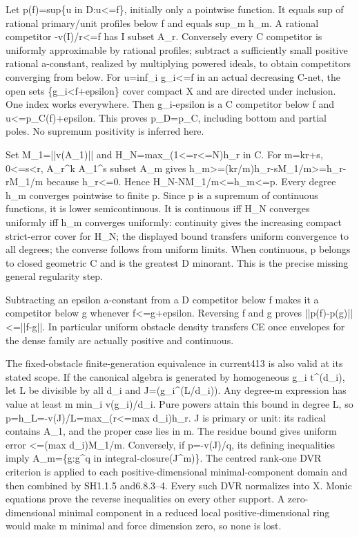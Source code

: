 \documentclass[11pt]{article}
\begin{document}
Let p(f)=sup\{u in D:u<=f\}, initially only a pointwise function. It equals sup of rational primary/unit profiles below f and equals sup\_m h\_m. A rational competitor -v(I)/r<=f has I subset A\_r. Conversely every C competitor is uniformly approximable by rational profiles; subtract a sufficiently small positive rational a-constant, realized by multiplying powered ideals, to obtain competitors converging from below. For u=inf\_i g\_i<=f in an actual decreasing C-net, the open sets \{g\_i<f+epsilon\} cover compact X and are directed under inclusion. One index works everywhere. Then g\_i-epsilon is a C competitor below f and u<=p\_C(f)+epsilon. This proves p\_D=p\_C, including bottom and partial poles. No supremum positivity is inferred here.

Set M\_1=||v(A\_1)|| and H\_N=max\_(1<=r<=N)h\_r in C. For m=kr+s, 0<=s<r, A\_r\textasciicircum{}k A\_1\textasciicircum{}s subset A\_m gives h\_m>=(kr/m)h\_r-sM\_1/m>=h\_r-rM\_1/m because h\_r<=0. Hence H\_N-NM\_1/m<=h\_m<=p. Every degree h\_m converges pointwise to finite p. Since p is a supremum of continuous functions, it is lower semicontinuous. It is continuous iff H\_N converges uniformly iff h\_m converges uniformly: continuity gives the increasing compact strict-error cover for H\_N; the displayed bound transfers uniform convergence to all degrees; the converse follows from uniform limits. When continuous, p belongs to closed geometric C and is the greatest D minorant. This is the precise missing general regularity step.

Subtracting an epsilon a-constant from a D competitor below f makes it a competitor below g whenever f<=g+epsilon. Reversing f and g proves ||p(f)-p(g)||<=||f-g||. In particular uniform obstacle density transfers CE once envelopes for the dense family are actually positive and continuous.

The fixed-obstacle finite-generation equivalence in current413 is also valid at its stated scope. If the canonical algebra is generated by homogeneous g\_i t\textasciicircum{}(d\_i), let L be divisible by all d\_i and J=(g\_i\textasciicircum{}(L/d\_i)). Any degree-m expression has value at least m min\_i v(g\_i)/d\_i. Pure powers attain this bound in degree L, so p=h\_L=-v(J)/L=max\_(r<=max d\_i)h\_r. J is primary or unit: its radical contains A\_1, and the proper case lies in m. The residue bound gives uniform error <=(max d\_i)M\_1/m. Conversely, if p=-v(J)/q, its defining inequalities imply A\_m=\{g:g\textasciicircum{}q in integral-closure(J\textasciicircum{}m)\}. The centred rank-one DVR criterion is applied to each positive-dimensional minimal-component domain and then combined by SH1.1.5 and6.8.3--4. Every such DVR normalizes into X. Monic equations prove the reverse inequalities on every other support. A zero-dimensional minimal component in a reduced local positive-dimensional ring would make m minimal and force dimension zero, so none is lost.
\end{document}
